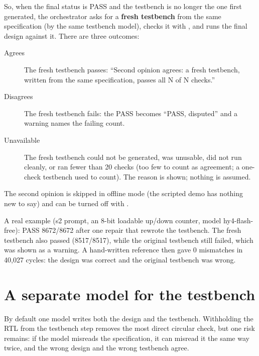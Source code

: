 So, when the final status is PASS and the testbench is no longer the one first generated, the orchestrator asks for a \textbf{fresh testbench} from the same specification (by the same testbench model), checks it with , and runs the final design against it. There are three outcomes:
\begin{description}
  \item[Agrees] The fresh testbench passes: ``Second opinion agrees: a fresh testbench, written from the same specification, passes all N of N checks.''
  \item[Disagrees] The fresh testbench fails: the PASS becomes ``PASS, disputed'' and a warning names the failing count.
  \item[Unavailable] The fresh testbench could not be generated, was unusable, did not run cleanly, or ran fewer than 20 checks (too few to count as agreement; a one-check testbench used to count). The reason is shown; nothing is assumed.
\end{description}
The second opinion is skipped in offline mode (the scripted demo has nothing new to say) and can be turned off with .

A real example (s2 prompt, an 8-bit loadable up/down counter, model hy4-flash-free): PASS 8672/8672 after one repair that rewrote the testbench. The fresh testbench also passed (8517/8517), while the original testbench still failed, which was shown as a warning. A hand-written reference then gave 0 mismatches in 40,027 cycles: the design was correct and the original testbench was wrong.

\section{A separate model for the testbench}
\label{sec:independenttb}

By default one model writes both the design and the testbench. Withholding the RTL from the testbench step removes the most direct circular check, but one risk remains: if the model misreads the specification, it can misread it the same way twice, and the wrong design and the wrong testbench agree.

